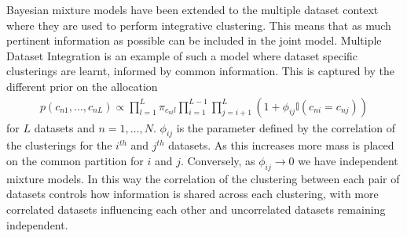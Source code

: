 \documentclass{bioinfo}
\begin{document}
Bayesian mixture models have been extended to the multiple dataset context where they are used to perform integrative clustering. This means that as much pertinent information as possible can be included in the joint model. Multiple Dataset Integration \citep[\textbf{MDI}, ][]{kirk2012bayesian} is an example of such a model where dataset specific clusterings are learnt, informed by common information. This is captured by the different prior on the allocation
\begin{align}
	p(c_{n1}, \ldots, c_{nL}) \propto \prod_{l=1}^L \pi_{c_{nl}l}\prod_{i=1}^{L-1}\prod_{j=i+1}^L(1 + \phi_{ij} \mathbb{I}(c_{ni} = c_{nj}))
	\label{eqn:mdiPrior}
\end{align}
for $L$ datasets and $n = 1,\ldots, N$. $\phi_{ij}$ is the parameter defined by the correlation of the clusterings for the $i^{th}$ and $j^{th}$ datasets. As this increases more mass is placed on the common partition for $i$ and $j$. Conversely, as $\phi_{ij}\to 0$ we have independent mixture models. In this way the correlation of the clustering between each pair of datasets controls how information is shared across each clustering, with more correlated datasets influencing each other and uncorrelated datasets remaining independent.



%	




\end{document}
